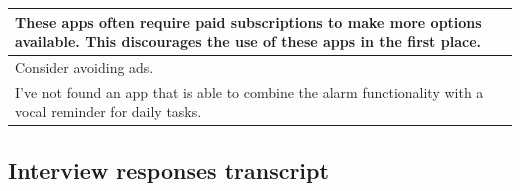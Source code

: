 \documentclass{article}
\begin{document}
\begin{table}[H]
\begin{tabularx}{0.9\textwidth}{X}
		\hline
		These apps often require paid subscriptions to make more options available. This discourages the use of these apps in the first place.                                                                                                                                                                                                                                                                                                                                                                                                                                                                                                                                                                                                                                       \\
		\hline
		Consider avoiding ads.                                                                                                                                                                                                                                                                                                                                                                                                                                                                                                                                                                                                                                                                                                                                                       \\
		\hline
		I've not found an app that is able to combine the alarm functionality with a vocal reminder for daily tasks.                                                                                                                                                                                                                                                                                                                                                                                                                                                                                                                                                                                                                                                                 \\
		\hline
	\end{tabularx}
\end{table}

\subsection{Interview responses transcript}
\label{subsec:interview-responses}
\end{document}
